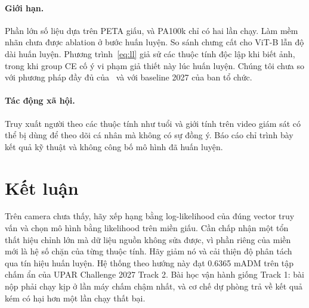 \documentclass[11pt,a4paper]{article}
\begin{document}
\paragraph{Giới hạn.} Phần lớn số liệu dựa trên PETA giấu, và PA100k chỉ có hai lần chạy. Làm mềm nhãn chưa được ablation ở bước huấn luyện. So sánh chưng cất cho ViT-B lẫn độ dài huấn luyện. Phương trình~\eqref{eq:ll} giả sử các thuộc tính độc lập khi biết ảnh, trong khi group CE cố ý vi phạm giả thiết này lúc huấn luyện. Chúng tôi chưa so với phương pháp đầy đủ của~\cite{specker21} và với baseline 2027 của ban tổ chức.

\paragraph{Tác động xã hội.} Truy xuất người theo các thuộc tính như tuổi và giới tính trên video giám sát có thể bị dùng để theo dõi cá nhân mà không có sự đồng ý. Báo cáo chỉ trình bày kết quả kỹ thuật và không công bố mô hình đã huấn luyện.

\section{Kết luận}

Trên camera chưa thấy, hãy xếp hạng bằng log-likelihood của đúng vector truy vấn và chọn mô hình bằng likelihood trên miền giấu. Cần chấp nhận một tổn thất hiệu chỉnh lớn mà dữ liệu nguồn không sửa được, vì phần riêng của miền mới là hệ số chặn của từng thuộc tính. Hãy giảm nó và cải thiện độ phân tách qua tín hiệu huấn luyện. Hệ thống theo hướng này đạt 0.6365 mADM trên tập chấm ẩn của UPAR Challenge 2027 Track 2. Bài học vận hành giống Track 1: bài nộp phải chạy kịp ở lần máy chấm chậm nhất, và cơ chế dự phòng trả về kết quả kém có hại hơn một lần chạy thất bại.
\end{document}
